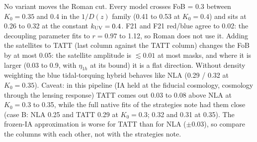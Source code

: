 No variant moves the Roman cut. Every model crosses FoB = 0.3 between
$K_0 = 0.35$ and 0.4 in the $1/D(z)$ family (0.41 to 0.53 at $K_0 = 0.4$) and
sits at 0.26 to 0.32 at the constant $k_{\rm UV} = 0.4$. F21 and F21 red/blue
agree to 0.02: the decoupling parameter fits to $r = 0.97$ to 1.12, so Roman
does not use it. Adding the satellites to TATT (last column against the TATT
column) changes the FoB by at most 0.05: the satellite amplitude is
$\lesssim 0.01$ at most masks, and where it is larger (0.03 to 0.9, with
$\eta_{1h}$ at its bound) it is a flat direction. Without density weighting
the blue tidal-torquing hybrid behaves like NLA (0.29 / 0.32 at $K_0 = 0.35$).
Caveat: in this pipeline (IA held at the fiducial cosmology, cosmology through
the lensing response) TATT comes out 0.03 to 0.08 above NLA at $K_0 = 0.3$ to
0.35, while the full native fits of the strategies note had them close (case B:
NLA 0.25 and TATT 0.29 at $K_0 = 0.3$; 0.32 and 0.31 at 0.35). The frozen-IA
approximation is worse for TATT than for NLA ($\pm 0.03$), so compare the
columns with each other, not with the strategies note.
